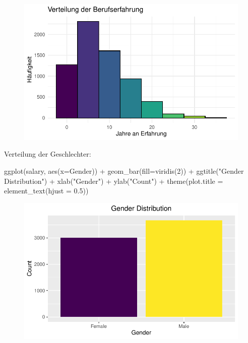 \documentclass[
  letterpaper,
  DIV=11,
  numbers=noendperiod]{scrartcl}
\newenvironment{Shaded}{\begin{snugshade}}{\end{snugshade}}
\newcommand{\AttributeTok}[1]{\textcolor[rgb]{0.40,0.45,0.13}{#1}}
\newcommand{\DecValTok}[1]{\textcolor[rgb]{0.68,0.00,0.00}{#1}}
\newcommand{\FloatTok}[1]{\textcolor[rgb]{0.68,0.00,0.00}{#1}}
\newcommand{\FunctionTok}[1]{\textcolor[rgb]{0.28,0.35,0.67}{#1}}
\newcommand{\NormalTok}[1]{\textcolor[rgb]{0.00,0.23,0.31}{#1}}
\newcommand{\SpecialCharTok}[1]{\textcolor[rgb]{0.37,0.37,0.37}{#1}}
\newcommand{\StringTok}[1]{\textcolor[rgb]{0.13,0.47,0.30}{#1}}
\begin{document}
\begin{figure}[H]

{\centering \includegraphics{main_doc_files/figure-pdf/unnamed-chunk-10-1.pdf}

}

\end{figure}

Verteilung der Geschlechter:

\begin{Shaded}
\begin{Highlighting}[]
\FunctionTok{ggplot}\NormalTok{(salary, }\FunctionTok{aes}\NormalTok{(}\AttributeTok{x=}\NormalTok{Gender)) }\SpecialCharTok{+}
  \FunctionTok{geom\_bar}\NormalTok{(}\AttributeTok{fill=}\FunctionTok{viridis}\NormalTok{(}\DecValTok{2}\NormalTok{)) }\SpecialCharTok{+}
  \FunctionTok{ggtitle}\NormalTok{(}\StringTok{"Gender Distribution"}\NormalTok{) }\SpecialCharTok{+}
  \FunctionTok{xlab}\NormalTok{(}\StringTok{"Gender"}\NormalTok{) }\SpecialCharTok{+}
  \FunctionTok{ylab}\NormalTok{(}\StringTok{"Count"}\NormalTok{) }\SpecialCharTok{+}
  \FunctionTok{theme}\NormalTok{(}\AttributeTok{plot.title =} \FunctionTok{element\_text}\NormalTok{(}\AttributeTok{hjust =} \FloatTok{0.5}\NormalTok{))}
\end{Highlighting}
\end{Shaded}

\begin{figure}[H]

{\centering \includegraphics{main_doc_files/figure-pdf/unnamed-chunk-11-1.pdf}

}

\end{figure}
\end{document}
